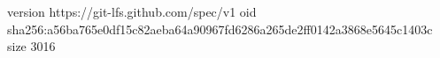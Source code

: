 version https://git-lfs.github.com/spec/v1
oid sha256:a56ba765e0df15c82aeba64a90967fd6286a265de2ff0142a3868e5645c1403c
size 3016
